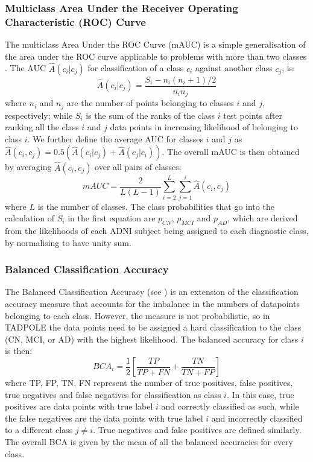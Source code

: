 \subsubsection{Multiclass Area Under the Receiver Operating Characteristic (ROC) Curve}

The multiclass Area Under the ROC Curve (mAUC) is a simple generalisation of the area under the ROC curve applicable to problems with more than two classes \cite{hand2001simple}. The AUC $\hat{A}(c_i|c_j)$ for classification of a class $c_i$ against another class $c_j$, is:
\begin{equation}
\hat{A}(c_i|c_j)=\frac{S_i-n_i(n_i+1)/2}{n_i n_j}
\end{equation}
where $n_i$ and $n_j$ are the number of points belonging to classes $i$ and $j$, respectively; while $S_i$ is the sum of the ranks of the class $i$ test points after ranking all the class $i$ and $j$ data points in increasing likelihood of belonging to class $i$. We further define the average AUC for classes $i$ and $j$ as $\hat{A}(c_i,c_j)= 0.5(\hat{A}(c_i|c_j)+\hat{A}(c_j|c_i))$. The overall mAUC is then obtained by averaging $\hat{A}(c_i,c_j)$ over all pairs of classes:
\begin{equation}
 mAUC = \frac{2}{L(L-1)}\sum_{i=2}^L\sum_{j=1}^{i}\hat{A}(c_i,c_j)
\end{equation}
where $L$ is the number of classes. The class probabilities that go into the calculation of $S_i$ in the first equation are $p_{CN}$, $p_{MCI}$ and $p_{AD}$, which are derived from the likelihoods of each ADNI subject being assigned to each diagnostic class, by normalising to have unity sum.

\subsubsection{Balanced Classification Accuracy}

The Balanced Classification Accuracy (see \cite{brodersen2010balanced}) is an extension of the classification accuracy measure that accounts for the imbalance in the numbers of datapoints belonging to each class. However, the measure is not probabilistic, so in TADPOLE the data points need to be assigned a hard classification to the class (CN, MCI, or AD) with the highest likelihood. The balanced accuracy for class $i$ is then:
\begin{equation}
 BCA_i = \frac{1}{2}\left[\frac{TP}{TP+FN}+\frac{TN}{TN+FP}\right]
\end{equation}
where TP, FP, TN, FN represent the number of true positives, false positives, true negatives and false negatives for classification as class $i$. In this case, true positives are data points with true label $i$ and correctly classified as such, while the false negatives are the data points with true label $i$ and incorrectly classified to a different class $j \ne i$. True negatives and false positives are defined similarly. The overall BCA is given by the mean of all the balanced accuracies for every class. 

